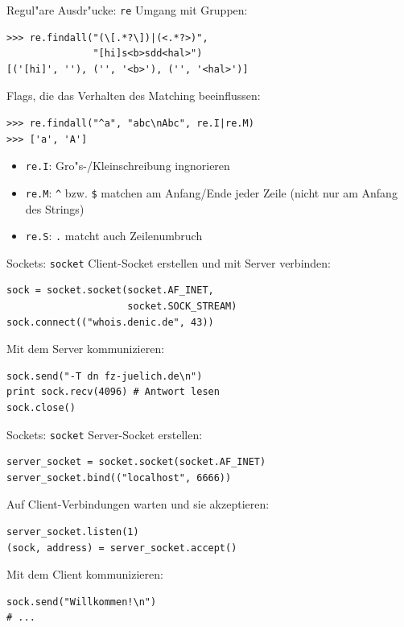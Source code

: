 \begin{frame}[fragile]{Regul"are Ausdr"ucke: \texttt{re}}
Umgang mit Gruppen:
\begin{lstlisting}[style=Shell]
>>> re.findall("(\[.*?\])|(<.*?>)", 
               "[hi]s<b>sdd<hal>")
[('[hi]', ''), ('', '<b>'), ('', '<hal>')]
\end{lstlisting}
\vspace*{2mm}
Flags, die das Verhalten des Matching beeinflussen:
\begin{lstlisting}[style=Shell]
>>> re.findall("^a", "abc\nAbc", re.I|re.M)
>>> ['a', 'A']
\end{lstlisting}
\begin{itemize}
\item \texttt{re.I}: Gro"s-/Kleinschreibung ingnorieren
\item \texttt{re.M}: \lstinline{^} bzw. \lstinline{$} matchen am Anfang/Ende jeder Zeile (nicht nur am Anfang des Strings) %
\item \texttt{re.S}: \lstinline{.} matcht auch Zeilenumbruch
\end{itemize}
\end{frame}

\begin{frame}[fragile]{Sockets: \texttt{socket}}
Client-Socket erstellen und mit Server verbinden:
\begin{lstlisting}[style=Python]
sock = socket.socket(socket.AF_INET, 
                     socket.SOCK_STREAM)
sock.connect(("whois.denic.de", 43))
\end{lstlisting}
\vspace*{2mm}
Mit dem Server kommunizieren:
\begin{lstlisting}[style=Python]
sock.send("-T dn fz-juelich.de\n")
print sock.recv(4096) # Antwort lesen
sock.close()
\end{lstlisting}
\end{frame}

\begin{frame}[fragile]{Sockets: \texttt{socket}}
Server-Socket erstellen:
\begin{lstlisting}[style=Python]
server_socket = socket.socket(socket.AF_INET)
server_socket.bind(("localhost", 6666))
\end{lstlisting}
\vspace*{2mm}
Auf Client-Verbindungen warten und sie akzeptieren:
\begin{lstlisting}[style=Python]
server_socket.listen(1)
(sock, address) = server_socket.accept()
\end{lstlisting}
\vspace*{2mm}
Mit dem Client kommunizieren:
\begin{lstlisting}[style=Python]
sock.send("Willkommen!\n")
# ...
\end{lstlisting}
\end{frame}

